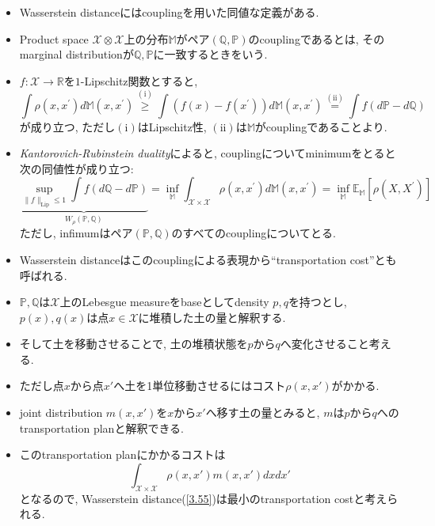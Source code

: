 \documentclass[aspectratio=169, dvipdfmx]{beamer}
\newcommand{\bb}{\mathbb}
\newcommand{\cc}{\mathcal}
\begin{document}
\begin{frame}
    \begin{itemize}
        \item Wasserstein distanceにはcouplingを用いた同値な定義がある.
        \item Product space $\cc{X}\otimes\cc{X}$上の分布$\bb{M}$がペア$(\bb{Q},\bb{P})$のcouplingであるとは,
        そのmarginal distributionが$\bb{Q},\bb{P}$に一致するときをいう.
        \item $f:\cc{X}\to\bb{R}$を$1$-Lipschitz関数とすると,
        \[
            \int \rho\left(x, x^{\prime}\right) d \bb{M}\left(x, x^{\prime}\right)
            \stackrel{(\mathrm{i})}{\geq} \int\left(f(x)-f\left(x^{\prime}\right)\right) d \bb{M}\left(x, x^{\prime}\right)
            \stackrel{(\mathrm{ii})}{=} \int f(d \mathbb{P}-d \mathbb{Q})
            \tag{3.54}\label{3.54}
        \]
        が成り立つ, ただし$\mathrm{(i)}$はLipschitz性, $\mathrm{(ii)}$は$\bb{M}$がcouplingであることより.
        \item {\it Kantorovich-Rubinstein duality}によると,
        couplingについてminimumをとると次の同値性が成り立つ:
        \[
            \underbrace{\sup _{\|f\|_{\mathrm{Lip}} \leq 1} \int f(d \mathbb{Q}-d \mathbb{P})}_{W_{\rho}(\mathbb{P}, \mathbb{Q})}
            =\inf_{\bb{M}} \int_{\cc{X} \times \cc{X}} \rho\left(x, x^{\prime}\right) d \bb{M}\left(x, x^{\prime}\right)
            =\inf_{\bb{M}} \mathbb{E}_{\bb{M}}\left[\rho\left(X, X^{\prime}\right)\right]
            \tag{3.55}\label{3.55}
        \]
        ただし, infimumはペア$(\bb{P},\bb{Q})$のすべてのcouplingについてとる.
    \end{itemize}
\end{frame}

\begin{frame}
    \begin{itemize}
        \item Wasserstein distanceはこのcouplingによる表現から``transportation cost''とも呼ばれる.
        \item $\bb{P}, \bb{Q}$は$\cc{X}$上のLebesgue measureをbaseとしてdensity $p, q$を持つとし,
        $p(x), q(x)$は点$x\in\cc{X}$に堆積した土の量と解釈する.
        \item そして土を移動させることで, 土の堆積状態を$p$から$q$へ変化させること考える.
        \item ただし点$x$から点$x'$へ土を1単位移動させるにはコスト$\rho(x, x')$がかかる.
        \item joint distribution $m(x, x')$を$x$から$x'$へ移す土の量とみると, $m$は$p$から$q$へのtransportation planと解釈できる.
        \item このtransportation planにかかるコストは
        \[ \int_{\cc{X}\times\cc{X}}\rho(x, x') m(x, x') dx dx'\]
        となるので, Wasserstein distance(\ref{3.55})は最小のtransportation costと考えられる.
    \end{itemize}
\end{frame}
\end{document}
